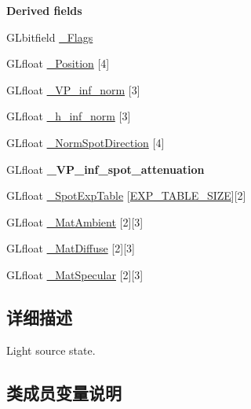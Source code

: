 \begin{Indent}\textbf{ Derived fields}\par
\begin{DoxyCompactItemize}
\item 
G\+Lbitfield \hyperlink{structgl__light_a0273420e342b2a142249cac953281ae1}{\+\_\+\+Flags}
\item 
G\+Lfloat \hyperlink{structgl__light_a5738156266dab35371b6382384cb87aa}{\+\_\+\+Position} \mbox{[}4\mbox{]}
\item 
G\+Lfloat \hyperlink{structgl__light_a6018e6f6998731d77e949a85505838ef}{\+\_\+\+V\+P\+\_\+inf\+\_\+norm} \mbox{[}3\mbox{]}
\item 
G\+Lfloat \hyperlink{structgl__light_ac88dc2c64bbc03ca62858a330d869f8b}{\+\_\+h\+\_\+inf\+\_\+norm} \mbox{[}3\mbox{]}
\item 
G\+Lfloat \hyperlink{structgl__light_a75028f45508de3de8026845f4fe4e697}{\+\_\+\+Norm\+Spot\+Direction} \mbox{[}4\mbox{]}
\item 
\mbox{\label{structgl__light_a6a12db9199a69d9ea89766038ff74075}} 
G\+Lfloat {\bfseries \+\_\+\+V\+P\+\_\+inf\+\_\+spot\+\_\+attenuation}
\item 
G\+Lfloat \hyperlink{structgl__light_a908233090fbeb49b5f88350a28608352}{\+\_\+\+Spot\+Exp\+Table} \mbox{[}\hyperlink{mtypes_8h_ac4be0146a8ca2e761074a8dd2e6e406e}{E\+X\+P\+\_\+\+T\+A\+B\+L\+E\+\_\+\+S\+I\+ZE}\mbox{]}\mbox{[}2\mbox{]}
\item 
G\+Lfloat \hyperlink{structgl__light_acd02bb8cc7e8af97d79ae78e394caac8}{\+\_\+\+Mat\+Ambient} \mbox{[}2\mbox{]}\mbox{[}3\mbox{]}
\item 
G\+Lfloat \hyperlink{structgl__light_a7f020f20cfa176c5e1c4966e0905c7c5}{\+\_\+\+Mat\+Diffuse} \mbox{[}2\mbox{]}\mbox{[}3\mbox{]}
\item 
G\+Lfloat \hyperlink{structgl__light_a24bc2e8d06342cef693746e2a44ebff5}{\+\_\+\+Mat\+Specular} \mbox{[}2\mbox{]}\mbox{[}3\mbox{]}
\end{DoxyCompactItemize}
\end{Indent}


\subsection{详细描述}
Light source state. 

\subsection{类成员变量说明}
\mbox{\label{structgl__light_ad822eeab5e7247ac68eec3da2302d8d7}} 
